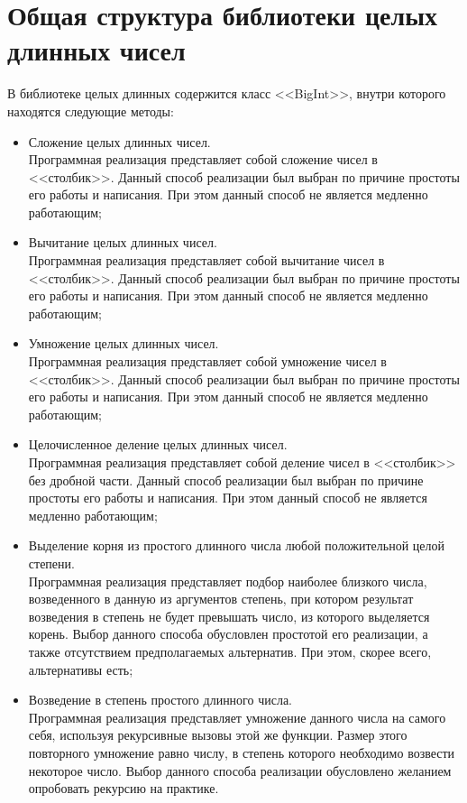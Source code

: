 \section{Общая структура библиотеки целых\\длинных чисел}
В библиотеке целых длинных содержится класс <<BigInt>>, внутри которого находятся следующие методы:
\begin{itemize}
    \item Сложение целых длинных чисел.\\
    Программная реализация представляет собой сложение чисел в <<столбик>>. Данный способ реализации был выбран по
    причине простоты его работы и написания. При этом данный способ не является медленно работающим;
    \item Вычитание целых длинных чисел.\\
    Программная реализация представляет собой вычитание чисел в <<столбик>>. Данный способ реализации был выбран по
    причине простоты его работы и написания. При этом данный способ не является медленно работающим;
    \item Умножение целых длинных чисел.\\
    Программная реализация представляет собой умножение чисел в <<столбик>>. Данный способ реализации был выбран по
    причине простоты его работы и написания. При этом данный способ не является медленно работающим;
    \item Целочисленное деление целых длинных чисел.\\
    Программная реализация представляет собой деление чисел в <<столбик>> без дробной части. Данный способ
    реализации был выбран по причине простоты его работы и написания. При этом данный способ не
    является медленно работающим;
    \item Выделение корня из простого длинного числа любой положительной целой степени.\\
    Программная реализация представляет подбор наиболее близкого числа, возведенного в данную из аргументов степень,
    при котором результат возведения в степень не будет превышать число, из которого выделяется корень.
    Выбор данного способа обусловлен простотой его реализации, а также отсутствием предполагаемых альтернатив.
    При этом, скорее всего, альтернативы есть;
    \item Возведение в степень простого длинного числа.\\
    Программная реализация представляет умножение данного числа на самого себя, используя рекурсивные вызовы этой же функции.
    Размер этого повторного умножение равно числу, в степень которого необходимо возвести некоторое число. Выбор
    данного способа реализации обусловлено желанием опробовать рекурсию на практике.
\end{itemize}

